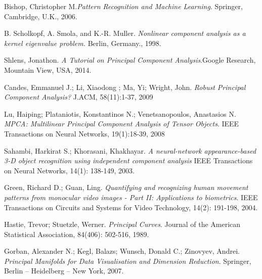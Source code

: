 \begin{thebibliography}{9}

 Bishop, Christopher M.\textit{Pattern Recognition and Machine Learning}. Springer, Cambridge, U.K., 2006.
 
B. Scholkopf, A. Smola, and K.-R. Muller.
\textit{Nonlinear component analysis as a kernel eigenvalue problem.}  Berlin, Germany., 1998.

 Shlens, Jonathon. \textit{A Tutorial on Principal Component Analysis}.Google Research, Mountain View, USA, 2014.

 Candes, Emmanuel J.; Li, Xiaodong ; Ma, Yi; Wright, John. \textit{Robust Principal Component Analysis?} J.ACM, 58(11):1-37, 2009 
 
 Lu, Haiping; Plataniotis, Konstantinos N.; Venetsanopoulos,  
 Anastasios N. 
 \textit{MPCA: Multilinear Principal Component Analysis of Tensor Objects}.  IEEE Transactions on Neural Networks, 19(1):18-39, 2008
 
 Sahambi, Harkirat S.; Khorasani, Khakhayar. \textit{A neural-network appearance-based 3-D object recognition using independent component analysis} IEEE Transactions on Neural Networks, 14(1): 138-149, 2003. 
 
 Green, Richard D.; Guan, Ling. \textit{Quantifying and recognizing human movement patterns from monocular video images - Part II: Applications to biometrics}. IEEE Transactions on Circuits and Systems for Video Technology, 14(2): 191-198, 2004. 
 
 Hastie, Trevor; Stuetzle, Werner. \textit{Principal Curves}. Journal of the American Statistical Association, 84(406): 502-516, 1989.

 Gorban,  Alexander N.; Kegl, Balazs; Wunsch, Donald C.; Zinovyev, Andrei. \textit{Principal Manifolds for Data Visualisation and Dimension Reduction}. Springer, Berlin – Heidelberg – New York, 2007. 
\end{thebibliography}

